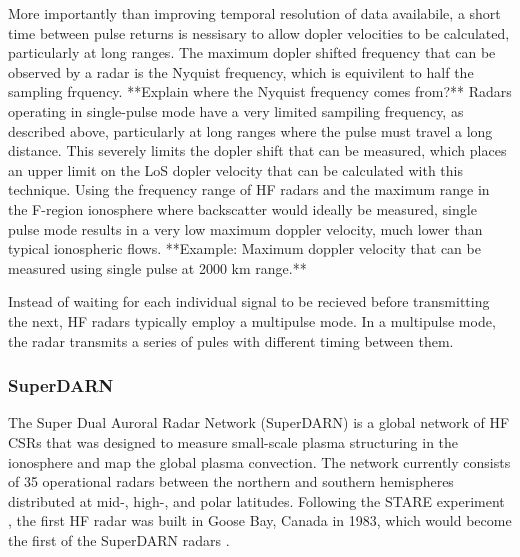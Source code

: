 More importantly than improving temporal resolution of data availabile, a short time between pulse returns is nessisary to allow dopler velocities to be calculated, particularly at long ranges.  The maximum dopler shifted frequency that can be observed by a radar is the Nyquist frequency, which is equivilent to half the sampling frquency.  **Explain where the Nyquist frequency comes from?**  Radars operating in single-pulse mode have a very limited sampiling frequency, as described above, particularly at long ranges where the pulse must travel a long distance.  This severely limits the dopler shift that can be measured, which places an upper limit on the LoS dopler velocity that can be calculated with this technique.  Using the frequency range of HF radars and the maximum range in the F-region ionosphere where backscatter would ideally be measured, single pulse mode results in a very low maximum doppler velocity, much lower than typical ionospheric flows.  **Example: Maximum doppler velocity that can be measured using single pulse at 2000 km range.**

Instead of waiting for each individual signal to be recieved before transmitting the next, HF radars typically employ a multipulse mode. In a multipulse mode, the radar transmits a series of pules with different timing between them.  


\subsubsection{SuperDARN}
\label{sec:superdarn}
The Super Dual Auroral Radar Network (SuperDARN) is a global network of HF CSRs that was designed to measure small-scale plasma structuring in the ionosphere and map the global plasma convection.  The network currently consists of 35 operational radars between the northern and southern hemispheres distributed at mid-, high-, and polar latitudes.  Following the STARE experiment \citep{Greenwald1978}, the first HF radar was built in Goose Bay, Canada in 1983, which would become the first of the SuperDARN radars \citep{Greenwald1985}.  

